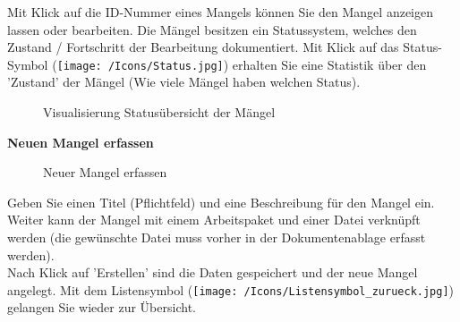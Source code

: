 \vspace{\baselineskip}

Mit Klick auf die ID-Nummer eines Mangels können Sie den Mangel anzeigen lassen oder bearbeiten. Die Mängel besitzen ein Statussystem, welches den Zustand / Fortschritt der Bearbeitung dokumentiert. Mit Klick auf das Status-Symbol (\texttt{[image: /Icons/Status.jpg]}) erhalten Sie eine Statistik über den 'Zustand' der Mängel (Wie viele Mängel haben welchen Status).

\begin{figure}[H]
\caption{Visualisierung Statusübersicht der Mängel}
\end{figure}

\textbf{Neuen Mangel erfassen}

\begin{figure}[H]
\caption{Neuer Mangel erfassen}
\end{figure}

Geben Sie einen Titel (Pflichtfeld) und eine Beschreibung für den Mangel ein. Weiter kann der Mangel mit einem Arbeitspaket und einer Datei verknüpft werden (die gewünschte Datei muss vorher in der Dokumentenablage erfasst werden).\\
Nach Klick auf 'Erstellen' sind die Daten gespeichert und der neue Mangel angelegt. Mit dem Listensymbol (\texttt{[image: /Icons/Listensymbol\_zurueck.jpg]}) gelangen Sie wieder zur Übersicht.

